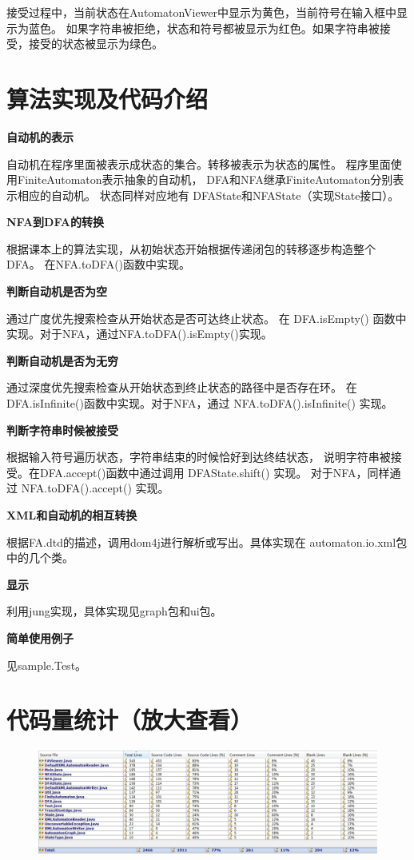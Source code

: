 \documentclass[12pt,a4paper]{article}
\begin{document}
\begin{CJK}{UTF8}{song}
    接受过程中，当前状态在AutomatonViewer中显示为黄色，当前符号在输入框中显示为蓝色。
    如果字符串被拒绝，状态和符号都被显示为红色。如果字符串被接受，接受的状态被显示为绿色。

    \section{算法实现及代码介绍}

    \textbf{自动机的表示}

    自动机在程序里面被表示成状态的集合。转移被表示为状态的属性。
        程序里面使用FiniteAutomaton表示抽象的自动机，
        DFA和NFA继承FiniteAutomaton分别表示相应的自动机。
        状态同样对应地有 DFAState和NFAState（实现State接口）。

    \textbf{NFA到DFA的转换}

    根据课本上的算法实现，从初始状态开始根据传递闭包的转移逐步构造整个DFA。
        在NFA.toDFA()函数中实现。

    \textbf{判断自动机是否为空}

    通过广度优先搜索检查从开始状态是否可达终止状态。
        在 DFA.isEmpty() 函数中实现。对于NFA，通过NFA.toDFA().isEmpty()实现。

    \textbf{判断自动机是否为无穷}

    通过深度优先搜索检查从开始状态到终止状态的路径中是否存在环。
        在DFA.isInfinite()函数中实现。对于NFA，通过 NFA.toDFA().isInfinite() 实现。

    \textbf{判断字符串时候被接受}

    根据输入符号遍历状态，字符串结束的时候恰好到达终结状态，
        说明字符串被接受。在DFA.accept()函数中通过调用 DFAState.shift() 实现。
        对于NFA，同样通过 NFA.toDFA().accept() 实现。

    \textbf{XML和自动机的相互转换}

    根据FA.dtd的描述，调用dom4j进行解析或写出。具体实现在
        automaton.io.xml包中的几个类。

    \textbf{显示}

    利用jung实现，具体实现见graph包和ui包。

    \textbf{简单使用例子}

    见sample.Test。
    
    \section{代码量统计（放大查看）}
    \begin{figure}[htbp!]
    \includegraphics[scale=.32]{Statistic}
    \label{fig:statistic}
    \end{figure}


\end{CJK}
\end{document}
